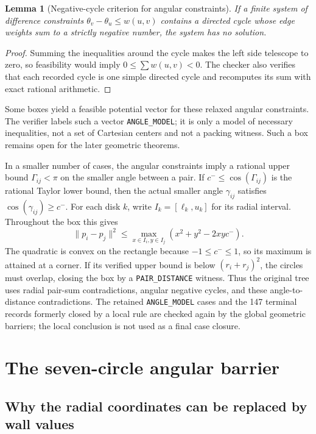 \documentclass[11pt,a4paper]{article}
\newtheorem{lemma}[theorem]{Lemma}
\theoremstyle{remark}
\newcommand{\norm}[1]{\lVert #1\rVert}
\begin{document}
\begin{lemma}[Negative-cycle criterion for angular constraints]
\label{lem:negative-cycle}
If a finite system of difference constraints
$\theta_v-\theta_u\le w(u,v)$ contains a directed cycle whose edge weights
sum to a strictly negative number, the system has no solution.
\end{lemma}

\begin{proof}
Summing the inequalities around the cycle makes the left side telescope to
zero, so feasibility would imply $0\le\sum w(u,v)<0$.  The checker also
verifies that each recorded cycle is one simple directed cycle and recomputes
its sum with exact rational arithmetic.
\end{proof}

Some boxes yield a feasible potential vector for these relaxed angular
constraints.  The verifier labels such a vector \texttt{ANGLE\_MODEL}; it is
only a model of necessary inequalities, not a set of Cartesian centers and
not a packing witness.  Such a box remains open for the later geometric
theorems.

In a smaller number of cases, the angular constraints imply a rational upper
bound $\Gamma_{ij}<\pi$ on the smaller angle between a pair.  If
$c^-\le\cos(\Gamma_{ij})$ is the rational Taylor lower bound, then the
actual smaller angle $\gamma_{ij}$ satisfies
$\cos(\gamma_{ij})\ge c^-$.  For each disk $k$, write
$I_k=[\ell_k,u_k]$ for its radial interval.  Throughout the box this gives
\[
  \norm{p_i-p_j}^2
  \le \max_{x\in I_i,y\in I_j}
       (x^2+y^2-2xyc^-).
\]
The quadratic is convex on the rectangle because $-1\le c^-\le1$, so its
maximum is attained at a corner.  If its verified upper bound is below
$(r_i+r_j)^2$, the circles must overlap, closing the box by a
\texttt{PAIR\_DISTANCE} witness.  Thus the original tree uses radial
pair-sum contradictions, angular negative cycles, and these angle-to-distance
contradictions.  The retained \texttt{ANGLE\_MODEL} cases and the
147 terminal records formerly closed by a local rule are checked again by
the global geometric barriers; the local conclusion is not used as a final
case closure.

\section{The seven-circle angular barrier}
\label{sec:barrier}

\subsection{Why the radial coordinates can be replaced by wall values}
\end{document}
